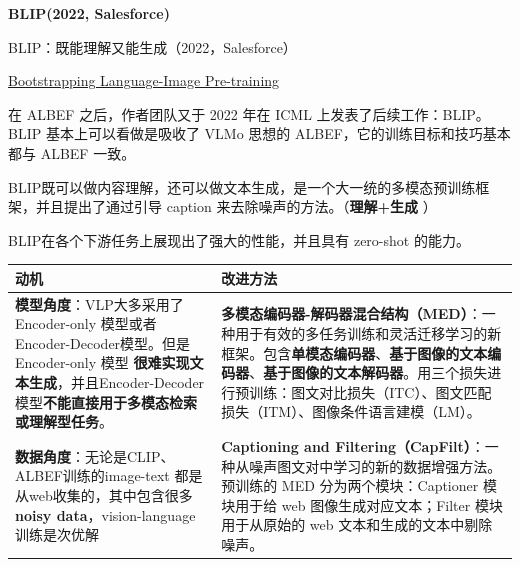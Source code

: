 \documentclass[zihao=false,fontset=windows]{ctexart}
\newcommand{\hy}[1]{\colorbox{hlYellow}{\textbf{#1}}}
\newcommand{\hp}[1]{\colorbox{feishuPinkBg}{\textbf{#1}}}
\begin{document}
{\bfseries BLIP(2022, Salesforce)\par}

\begin{feishuquote}
BLIP：既能理解又能生成（2022，Salesforce）\par
\href{https://arxiv.org/abs/2201.12086}{Bootstrapping Language-Image Pre-training}\par
\end{feishuquote}

在 ALBEF 之后，作者团队又于 2022 年在 ICML 上发表了后续工作：BLIP。BLIP 基本上可以看做是吸收了 VLMo 思想的 ALBEF，它的训练目标和技巧基本都与 ALBEF 一致。\par

\par\vspace{1.15em}\par\vspace{0.28em}
BLIP既可以做内容理解，还可以做文本生成，是一个大一统的多模态预训练框架，并且提出了通过引导 caption 来去除噪声的方法。（\textcolor{feishuRed}{\textbf{理解+生成 }}）\par
BLIP在各个下游任务上展现出了强大的性能，并且具有 zero-shot 的能力。\par

{\renewcommand{\arraystretch}{1.35}%
\begin{tabularx}{\textwidth}{|>{\raggedright\arraybackslash}X|>{\raggedright\arraybackslash}X|}
\hline
\cellcolor{callOrange}动机 & \cellcolor{callYellow}改进方法 \\
\hline
\hy{模型角度}：VLP大多采用了Encoder-only 模型或者Encoder-Decoder模型。但是Encoder-only 模型 \textbf{很难实现文本生成}，并且Encoder-Decoder 模型\textbf{不能直接用于多模态检索或理解型任务}。
&
\hp{多模态编码器-解码器混合结构（MED）}：一种用于有效的多任务训练和灵活迁移学习的新框架。包含\textbf{单模态编码器}、\textbf{基于图像的文本编码器}、\textbf{基于图像的文本解码器}。用三个损失进行预训练：图文对比损失（ITC）、图文匹配损失（ITM）、图像条件语言建模（LM）。 \\
\hline
\hy{数据角度}：无论是CLIP、ALBEF训练的image-text 都是从web收集的，其中包含很多\textbf{noisy data}，vision-language训练是次优解
&
\hp{Captioning and Filtering（CapFilt）}：一种从噪声图文对中学习的新的数据增强方法。预训练的 MED 分为两个模块：Captioner 模块用于给 web 图像生成对应文本；Filter 模块用于从原始的 web 文本和生成的文本中剔除噪声。 \\
\hline
\end{tabularx}}
\end{document}
